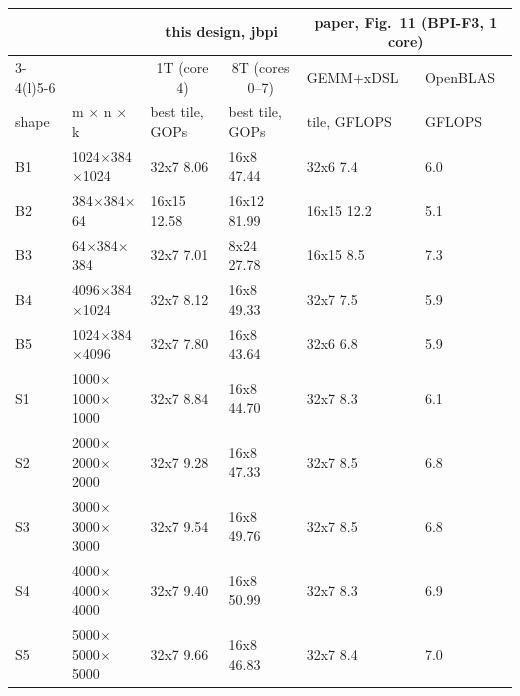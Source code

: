 \begin{center}\small
\begin{tabular}{@{}l l l l@{\hspace{1.5em}}l l@{}}
\toprule
 & & \multicolumn{2}{c}{this design, jbpi} & \multicolumn{2}{c}{paper, Fig.~11 (BPI-F3, 1 core)} \\
\cmidrule(lr){3-4}\cmidrule(l){5-6}
 & & \multicolumn{1}{c}{1T (core 4)} & \multicolumn{1}{c}{8T (cores 0--7)} & GEMM+xDSL & OpenBLAS \\
shape & m $\times$ n $\times$ k & best tile, GOPs & best tile, GOPs & tile, GFLOPS & GFLOPS \\
\midrule
B1 & 1024$\times$384$\times$1024 & 32x7 8.06 & 16x8 47.44 & 32x6 7.4 & 6.0 \\
B2 & 384$\times$384$\times$64 & 16x15 12.58 & 16x12 81.99 & 16x15 12.2 & 5.1 \\
B3 & 64$\times$384$\times$384 & 32x7 7.01 & 8x24 27.78 & 16x15 8.5 & 7.3 \\
B4 & 4096$\times$384$\times$1024 & 32x7 8.12 & 16x8 49.33 & 32x7 7.5 & 5.9 \\
B5 & 1024$\times$384$\times$4096 & 32x7 7.80 & 16x8 43.64 & 32x6 6.8 & 5.9 \\
S1 & 1000$\times$1000$\times$1000 & 32x7 8.84 & 16x8 44.70 & 32x7 8.3 & 6.1 \\
S2 & 2000$\times$2000$\times$2000 & 32x7 9.28 & 16x8 47.33 & 32x7 8.5 & 6.8 \\
S3 & 3000$\times$3000$\times$3000 & 32x7 9.54 & 16x8 49.76 & 32x7 8.5 & 6.8 \\
S4 & 4000$\times$4000$\times$4000 & 32x7 9.40 & 16x8 50.99 & 32x7 8.3 & 6.9 \\
S5 & 5000$\times$5000$\times$5000 & 32x7 9.66 & 16x8 46.83 & 32x7 8.4 & 7.0 \\
\bottomrule
\end{tabular}
\end{center}

